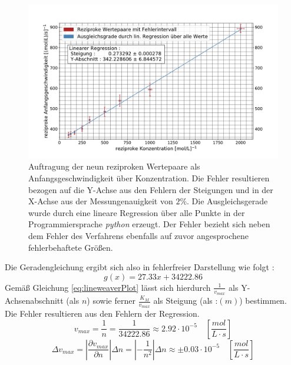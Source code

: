 \begin{figure}[H]
	\centering	
	\begin{minipage}{1\textwidth}
		\includegraphics[width=\columnwidth]{Bilder/Lineweaver.pdf}
	\end{minipage}
	\caption{Auftragung der neun reziproken Wertepaare als Anfangsgeschwindigkeit über Konzentration. Die Fehler resultieren bezogen auf die Y-Achse aus den Fehlern der Steigungen und in der X-Achse aus der Messungenauigkeit von $2\%$. Die Ausgleichsgerade wurde durch eine lineare Regression über alle Punkte in der Programmiersprache \textit{python} erzeugt. Der Fehler bezieht sich neben dem Fehler des Verfahrens ebenfalls auf zuvor angesprochene fehlerbehaftete Größen.}
	\label{Lineweaver}
\end{figure}
Die Geradengleichung ergibt sich also in fehlerfreier Darstellung wie folgt : 
\begin{equation}
g(x) = 27.33x + 34222.86
\label{Geradengleichung}
\end{equation}
Gemäß Gleichung \ref{eq:lineweaverPlot} lässt sich hierdurch $\frac{1}{v_{max}}$ als Y-Achsenabschnitt (als $n$) sowie ferner $\frac{K_M}{v_{max}}$ als Steigung (als :$(m)$) bestimmen. Die Fehler resultieren aus den Fehlern der Regression.\\
\begin{equation}
v_{max} = \frac{1}{n} = \frac{1}{34222.86} \approx 2.92\cdot 10^{-5} \quad \left[\si{\frac{mol}{L\cdot s}}\right]
\end{equation}
\begin{equation}
\Delta v_{max} = |\frac{\partial v_{max}}{\partial n}|\Delta n = |-\frac{1}{n^2}|\Delta n \approx \pm 0.03  \cdot 10^{-5}\quad \left[\si{\frac{mol}{L\cdot s}}\right]
\end{equation}
